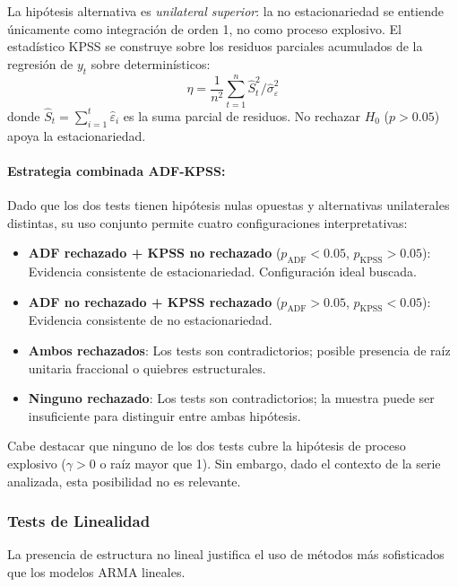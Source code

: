 La hipótesis alternativa es \textit{unilateral superior}: la no estacionariedad se entiende únicamente como integración de orden 1, no como proceso explosivo. El estadístico KPSS se construye sobre los residuos parciales acumulados de la regresión de $y_t$ sobre determinísticos:
\begin{equation}
\hat{\eta} = \frac{1}{n^2} \sum_{t=1}^{n} \hat{S}_t^2 \Big/ \hat{\sigma}^2_\varepsilon
\end{equation}
donde $\hat{S}_t = \sum_{i=1}^{t} \hat{\varepsilon}_i$ es la suma parcial de residuos. No rechazar $H_0$ ($p > 0.05$) apoya la estacionariedad.

\paragraph{Estrategia combinada ADF-KPSS:}
Dado que los dos tests tienen hipótesis nulas opuestas y alternativas unilaterales distintas, su uso conjunto permite cuatro configuraciones interpretativas:
\begin{itemize}
    \item \textbf{ADF rechazado + KPSS no rechazado} ($p_{\text{ADF}} < 0.05$, $p_{\text{KPSS}} > 0.05$): Evidencia consistente de estacionariedad. Configuración ideal buscada.
    \item \textbf{ADF no rechazado + KPSS rechazado} ($p_{\text{ADF}} > 0.05$, $p_{\text{KPSS}} < 0.05$): Evidencia consistente de no estacionariedad.
    \item \textbf{Ambos rechazados}: Los tests son contradictorios; posible presencia de raíz unitaria fraccional o quiebres estructurales.
    \item \textbf{Ninguno rechazado}: Los tests son contradictorios; la muestra puede ser insuficiente para distinguir entre ambas hipótesis.
\end{itemize}
Cabe destacar que ninguno de los dos tests cubre la hipótesis de proceso explosivo ($\gamma > 0$ o raíz mayor que 1). Sin embargo, dado el contexto de la serie analizada, esta posibilidad no es relevante.

\subsubsection{Tests de Linealidad}

La presencia de estructura no lineal justifica el uso de métodos más sofisticados que los modelos ARMA lineales.

